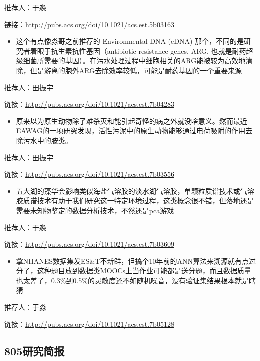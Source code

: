 \documentclass[]{book}
\providecommand{\tightlist}{%
  \setlength{\itemsep}{0pt}\setlength{\parskip}{0pt}}
\begin{document}
推荐人：于淼

链接：\url{http://pubs.acs.org/doi/10.1021/acs.est.5b03163}

\begin{itemize}
\tightlist
\item
  这个有点像淼哥之前推荐的 Environmental DNA (eDNA)
  那个，不同的是研究者着眼于抗生素抗性基因（antibiotic resistance genes,
  ARG,
  也就是耐药超级细菌所需要的基因）。在污水处理过程中细胞相关的ARG能被较为高效地清除，但是游离的胞外ARG去除效率较低，可能是耐药基因的一个重要来源
\end{itemize}

推荐人：田振宇

链接：\url{http://pubs.acs.org/doi/10.1021/acs.est.7b04283}

\begin{itemize}
\tightlist
\item
  原来以为原生动物除了难杀灭和能引起奇怪的病之外就没啥意义。然而最近EAWAG的一项研究发现，活性污泥中的原生动物能够通过电荷吸附的作用去除污水中的胺类。
\end{itemize}

推荐人：田振宇

链接：\url{http://pubs.acs.org/doi/10.1021/acs.est.7b03556}

\begin{itemize}
\tightlist
\item
  五大湖的藻华会影响类似海盐气溶胶的淡水湖气溶胶，单颗粒质谱技术或气溶胶质谱技术有助于我们研究这一特定环境过程，这类概念很不错，但落地还是需要未知物鉴定的数据分析技术，不然还是pca游戏
\end{itemize}

推荐人：于淼

链接：\url{http://pubs.acs.org/doi/10.1021/acs.est.7b03609}

\begin{itemize}
\tightlist
\item
  拿NHANES数据集发ES\&T不新鲜，但搞个10年前的ANN算法来溯源就有点过分了，这种题目放到数据类MOOCs上当作业可能都是送分题，而且数据质量也太差了，0.3\%到0.5\%的灵敏度还不如随机噪音，没有验证集结果根本就是瞎猜
\end{itemize}

推荐人：于淼

链接：\url{http://pubs.acs.org/doi/10.1021/acs.est.7b05128}

\subsection*{805研究简报}\label{-1}
\end{document}

